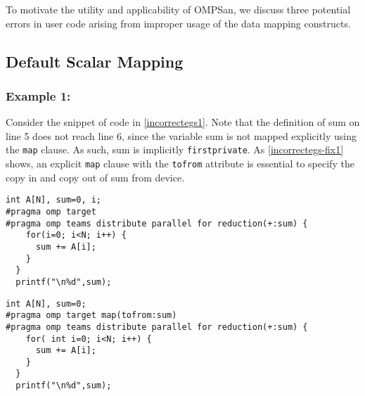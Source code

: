 To motivate the utility and applicability of OMPSan,
we discuss three potential errors in user code arising from 
improper usage of the data mapping constructs.

\vspace{-10pt} 
\subsection{Default Scalar Mapping}
\subsubsection{Example 1:}
Consider the snippet of code in \autoref{incorrectegs1}.
Note that the definition of \textsf{sum} on line 5 does not reach line 6,
since the variable \textsf{sum} is not mapped explicitly using the \texttt{map} 
clause. As such, \textsf{sum}  is implicitly \texttt{firstprivate}. 
As \autoref{incorrectegs-fix1} shows, an explicit \texttt{map} clause with the
\texttt{tofrom} attribute is essential to specify the copy in and copy out of
 \textsf{sum} from device.

\begin{minipage}{.4\textwidth}
\begin{lstlisting}[style=customc, frame=tlrb, caption={Default scalar map}, label=incorrectegs1]
int A[N], sum=0, i;
#pragma omp target
#pragma omp teams distribute parallel for reduction(+:sum) {
    for(i=0; i<N; i++) {
      sum += A[i];
    }
  }  
  printf("\n%d",sum);
\end{lstlisting}
\end{minipage}\hfil
\begin{minipage}{.4\textwidth}
\begin{lstlisting}[style=customc, frame=tlrb, caption={Explicit map}, label=incorrectegs-fix1]
int A[N], sum=0;
#pragma omp target map(tofrom:sum)
#pragma omp teams distribute parallel for reduction(+:sum) {
    for( int i=0; i<N; i++) {
      sum += A[i];
    }
  }
  printf("\n%d",sum);
\end{lstlisting}
\end{minipage}
\vspace{-10pt}
